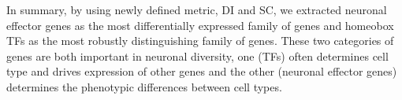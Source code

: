 In summary, by using newly defined metric, DI and SC, we extracted neuronal effector genes as the most differentially expressed family of genes and homeobox TFs as the most robustly distinguishing family of genes. These two categories of genes are both important in neuronal diversity, one (TFs) often determines cell type and drives expression of other genes and the other (neuronal effector genes) determines the phenotypic differences between cell types. 




















